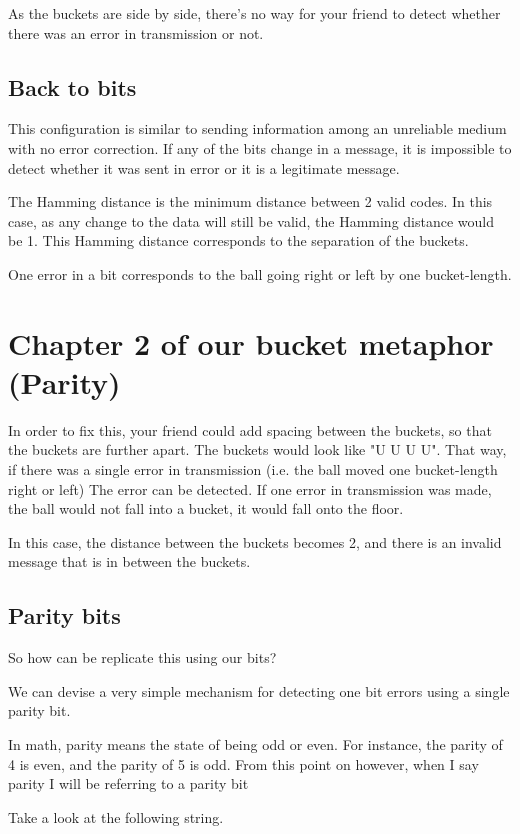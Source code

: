 \documentclass{article}
\begin{document}
  As the buckets are side by side, there's no way for your friend to detect whether there was an error in transmission or not.

  \subsection*{Back to bits}
  This configuration is similar to sending information among an unreliable medium with no error correction. If any of the bits change in a message, it is impossible to detect whether it was sent in error or it is a legitimate message.

  The Hamming distance is the minimum distance between 2 valid codes. In this case, as any change to the data will still be valid, the Hamming distance would be 1. This Hamming distance corresponds to the separation of the buckets.

  One error in a bit corresponds to the ball going right or left by one bucket-length.

  \section*{Chapter 2 of our bucket metaphor (Parity)}

  In order to fix this, your friend could add spacing between the buckets, so that the buckets are further apart. The buckets would look like "U U U U". That way, if there was a single error in transmission (i.e. the ball moved one bucket-length right or left) The error can be detected. If one error in transmission was made, the ball would not fall into a bucket, it would fall onto the floor.

  In this case, the distance between the buckets becomes 2, and there is an invalid message that is in between the buckets.

  \subsection*{Parity bits}
  So how can be replicate this using our bits?

  We can devise a very simple mechanism for detecting one bit errors using a single parity bit.

  In math, parity means the state of being odd or even. For instance, the parity of 4 is even, and the parity of 5 is odd. From this point on however, when I say parity I will be referring to a parity bit

  Take a look at the following string.
\end{document}
